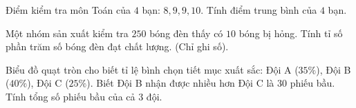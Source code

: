 \begin{ex} %
Điểm kiểm tra môn Toán của $4$ bạn: $8, 9, 9, 10$. Tính điểm trung bình của $4$ bạn.
\end{ex}

\begin{ex} %
Một nhóm sản xuất kiểm tra $250$ bóng đèn thấy có $10$ bóng bị hỏng. Tính tỉ số phần trăm số bóng đèn đạt chất lượng. (Chỉ ghi số).
\end{ex}

\begin{ex} %
Biểu đồ quạt tròn cho biết tỉ lệ bình chọn tiết mục xuất sắc: Đội A ($35\%$), Đội B ($40\%$), Đội C ($25\%$). Biết Đội B nhận được nhiều hơn Đội C là $30$ phiếu bầu. Tính tổng số phiếu bầu của cả 3 đội.
\end{ex}
